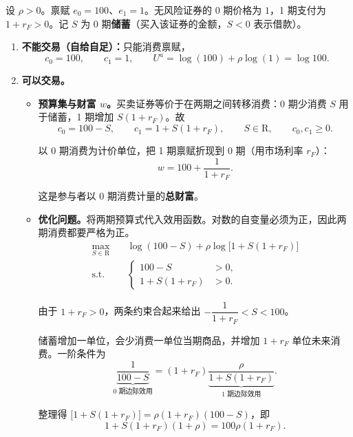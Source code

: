 \begin{solution}[blank-type=manual,blank-vsep=9\baselineskip]
设 $\rho>0$。禀赋 $e_0=100$、$e_1=1$。无风险证券的 0 期价格为 $1$，1 期支付为 $1+r_F>0$。记 $S$ 为 0 期\textbf{储蓄}（买入该证券的金额，$S<0$ 表示借款）。

\begin{enumerate}[label=(\alph*)]
    \item \textbf{不能交易（自给自足）：}只能消费禀赋，
    \[
        c_0=100,\qquad c_1=1,\qquad
        U^{a}=\log(100)+\rho\log(1)=\log 100.
    \]

    \item \textbf{可以交易。}
    \begin{itemize}
        \item \textbf{预算集与财富 $w$。}买卖证券等价于在两期之间转移消费：0 期少消费 $S$ 用于储蓄，1 期增加 $S(1+r_F)$。故
        \[
            c_0=100-S,\qquad c_1=1+S(1+r_F),\qquad S\in\mathrm{R},\qquad c_0,c_1\ge0.
        \]

        以 0 期消费为计价单位，把 1 期禀赋折现到 0 期（用市场利率 $r_F$）：
        \[
            w=100+\frac{1}{1+r_F}.
        \]

        这是参与者以 0 期消费计量的\textbf{总财富}。

        \item \textbf{优化问题。}将两期预算式代入效用函数。对数的自变量必须为正，因此两期消费都要严格为正。
        \[
            \begin{aligned}
                \max_{S\in\mathrm{R}}\quad &\log(100-S)+\rho\log\bigl[1+S(1+r_F)\bigr]\\
                \text{s.t.}\quad &
                \left\{\begin{aligned}
                    100-S&>0,\\
                    1+S(1+r_F)&>0.
                \end{aligned}\right.
            \end{aligned}
        \]

        由于 $1+r_F>0$，两条约束合起来给出 $-\dfrac{1}{1+r_F}<S<100$。

        储蓄增加一单位，会少消费一单位当期商品，并增加 $1+r_F$ 单位未来消费。一阶条件为
        \[
            \underbrace{\frac{1}{100-S}}_{\text{0 期边际效用}}
            =(1+r_F)\underbrace{\frac{\rho}{1+S(1+r_F)}}_{\text{1 期边际效用}}.
        \]

        整理得 $\bigl[1+S(1+r_F)\bigr]=\rho(1+r_F)(100-S)$，即
        \[
            1+S(1+r_F)(1+\rho)=100\rho(1+r_F).
        \]
        

\end{itemize}
\end{enumerate}
\end{solution}
